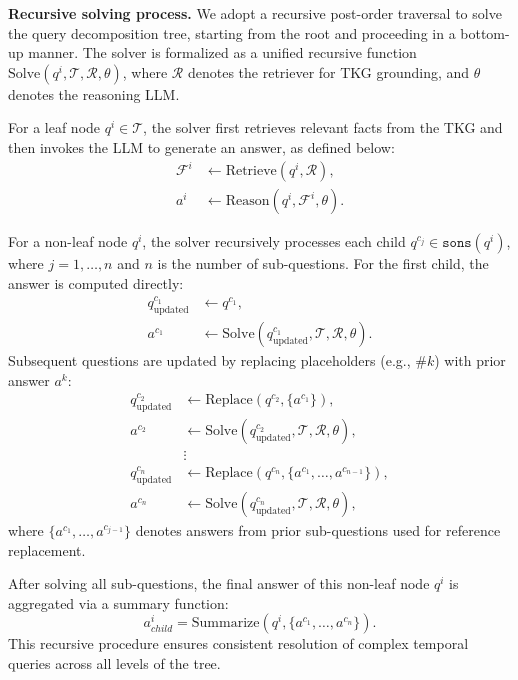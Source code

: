 \documentclass[11pt]{article}
\begin{document}
\textbf{Recursive solving process.}
We adopt a recursive post-order traversal to solve the query decomposition tree, starting from the root and proceeding in a bottom-up manner. The solver is formalized as a unified recursive function \( \text{Solve}(q^i, \mathcal{T}, \mathcal{R}, \theta) \), where \( \mathcal{R} \) denotes the retriever for TKG grounding, and \( \theta \) denotes the reasoning LLM.

For a leaf node \( q^i \in \mathcal{T} \), the solver first retrieves relevant facts from the TKG and then invokes the LLM to generate an answer, as defined below:
\begin{align}
\mathcal{F}^i &\leftarrow \text{Retrieve}(q^i, \mathcal{R}), \\
a^i &\leftarrow \text{Reason}(q^i, \mathcal{F}^i, \theta).
\end{align}


For a non-leaf node \( q^i \), the solver recursively processes each child \( q^{c_j} \in \texttt{sons}(q^i) \), where \( j = 1,\dots,n \) and \( n \) is the number of sub-questions. For the first child, the answer is computed directly:
\begin{align}
q^{c_1}_{\text{updated}} &\leftarrow q^{c_1}, \\
a^{c_1} &\leftarrow \text{Solve}(q^{c_1}_{\text{updated}}, \mathcal{T}, \mathcal{R}, \theta).
\end{align}
Subsequent questions are updated by replacing placeholders (e.g., \(\#k\)) with prior answer \(a^k\):
\begin{align}
q^{c_2}_{\text{updated}} &\leftarrow \text{Replace}(q^{c_2}, \{a^{c_1}\}), \\
a^{c_2} &\leftarrow \text{Solve}(q^{c_2}_{\text{updated}}, \mathcal{T}, \mathcal{R}, \theta), \\
&\vdots \\
q^{c_n}_{\text{updated}} &\leftarrow \text{Replace}(q^{c_n}, \{a^{c_1}, \ldots, a^{c_{n-1}}\}), \\
a^{c_n} &\leftarrow \text{Solve}(q^{c_n}_{\text{updated}}, \mathcal{T}, \mathcal{R}, \theta),
\end{align}
where \(\{a^{c_1}, \ldots, a^{c_{j-1}}\}\) denotes answers from prior sub-questions used for reference replacement.

After solving all sub-questions, the final answer of this non-leaf node \( q^i \) is aggregated via a summary function:
\begin{equation}
a_{child}^i = \text{Summarize}(q^i, \{a^{c_1}, \ldots, a^{c_n}\}).
\end{equation}
This recursive procedure ensures consistent resolution of complex temporal queries across all levels of the tree.
\end{document}
